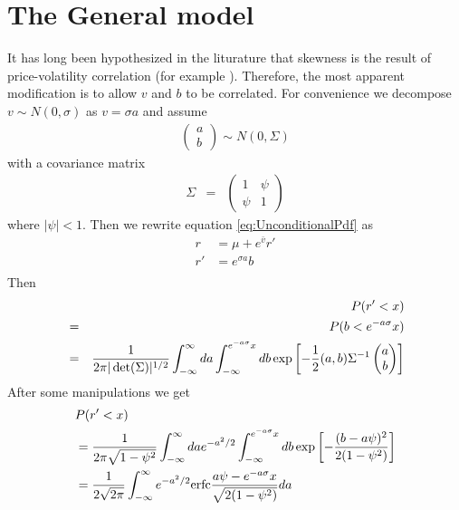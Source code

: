 \section{The General model}\label{sec:SLV_Asymmetric}
It has long been hypothesized in the liturature that skewness is the
result of price-volatility correlation (for example
\cite{Potters2003}). Therefore, the most apparent modification is to
allow $v$ and $b$ to be correlated. For convenience we decompose
$v \sim N(0, \sigma)$ as $v = \sigma a$ and assume
\begin{eqnarray*}
  \begin{pmatrix}
    a \\
    b
  \end{pmatrix} \sim N(0, \Sigma)
\end{eqnarray*}
with a covariance matrix
\begin{eqnarray*}
    \Sigma &=&
  \begin{pmatrix}
    1 & \psi \\
    \psi & 1
  \end{pmatrix}
\end{eqnarray*}
where $|\psi| < 1$. Then we rewrite equation \ref{eq:UnconditionalPdf}
as
\begin{equation}
  \label{eq:r_t}
  \begin{aligned}
    r &= \mu + e^{\bar{v}} r' \\
    r' &= e^{\sigma a} b \\
  \end{aligned}
\end{equation}
Then
\begin{eqnarray*}
  && P(r' < x)\\
  &=& P(b < e^{-a\sigma}x) \\
  &=& {1 \over 2\pi |\det(\Sigma)|^{1/2}}
  \int_{-\infty}^{\infty} da \int_{-\infty}^{e^{-a\sigma}x} db
  \exp\left[
    -{1 \over 2} (a, b) \Sigma^{-1}
    \begin{pmatrix}
      a \\
      b
    \end{pmatrix}
  \right] \\
\end{eqnarray*}
After some manipulations we get
\begin{equation}\label{eq:UncondCDFAsymmetric}
  \begin{aligned}
    & P(r' < x) \\  
    &= {1 \over 2\pi \sqrt{1 - \psi^2}} \int_{-\infty}^{\infty} da
    e^{-a^2/2} \int_{-\infty}^{e^{-a\sigma}x} db
    \exp\left[
      - {(b - a\psi)^2 \over 2(1 - \psi^2)}
    \right] \\
    &= {1 \over 2\sqrt{2\pi}} \int_{-\infty}^{\infty} e^{-a^2/2}
    \text{erfc}{a\psi - e^{-a\sigma} x \over \sqrt{2(1-\psi^2)}} da
  \end{aligned}
\end{equation}
